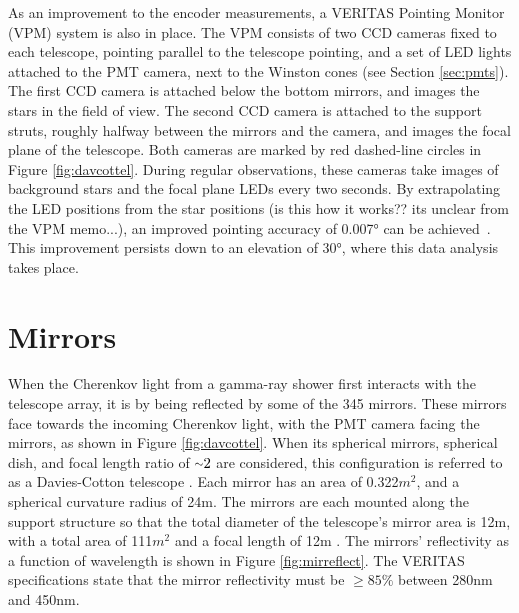 As an improvement to the encoder measurements, a VERITAS Pointing Monitor (VPM) system is also in place.
The VPM consists of two CCD cameras fixed to each telescope, pointing parallel to the telescope pointing, and a set of LED lights attached to the PMT camera, next to the Winston cones (see Section \ref{sec:pmts}).
The first CCD camera is attached below the bottom mirrors, and images the stars in the field of view.
The second CCD camera is attached to the support struts, roughly halfway between the mirrors and the camera, and images the focal plane of the telescope.
Both cameras are marked by red dashed-line circles in Figure \ref{fig:davcottel}.
During regular observations, these cameras take images of background stars and the focal plane LEDs every two seconds.
By extrapolating the LED positions from the star positions {\color{red}(is this how it works?? its unclear from the VPM memo...)}, an improved pointing accuracy of \nicetilde{}\ang{0.007} can be achieved~\cite{VPMmemo}.
%
This improvement persists down to an elevation of \ang{30}, where this data analysis takes place.

\section{Mirrors}\label{sec:mirrors}

When the Cherenkov light from a gamma-ray shower first interacts with the telescope array, it is by being reflected by some of the 345 mirrors.
These mirrors face towards the incoming Cherenkov light, with the PMT camera facing the mirrors, as shown in Figure \ref{fig:davcottel}.
When its spherical mirrors, spherical dish, and focal length ratio of $ \nicetilde 2 $ are considered, this configuration is referred to as a Davies-Cotton telescope \cite{daviescotton}.
Each mirror has an area of 0.322$m^2$, and a spherical curvature radius of 24m.
The mirrors are each mounted along the support structure so that the total diameter of the telescope's mirror area is 12m, with a total area of 111$m^2$ and a focal length of 12m \cite{Veritas_Detector}.
The mirrors' reflectivity as a function of wavelength is shown in Figure \ref{fig:mirreflect}.
The VERITAS specifications state that the mirror reflectivity must be $\geq 85\%$ between 280nm and 450nm.

